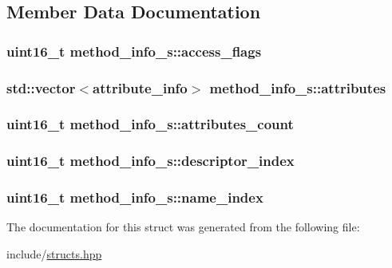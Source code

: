\subsection{Member Data Documentation}
\hypertarget{structmethod__info__s_a062a031a987939214bf617101bce7435}{
\subsubsection[{access\+\_\+flags}]{\setlength{\rightskip}{0pt plus 5cm}uint16\+\_\+t method\+\_\+info\+\_\+s\+::access\+\_\+flags}}\label{structmethod__info__s_a062a031a987939214bf617101bce7435}
\hypertarget{structmethod__info__s_a4e4f4472bdd775cda7fdc50797defe66}{
\subsubsection[{attributes}]{\setlength{\rightskip}{0pt plus 5cm}std\+::vector$<${\bf attribute\+\_\+info}$>$ method\+\_\+info\+\_\+s\+::attributes}}\label{structmethod__info__s_a4e4f4472bdd775cda7fdc50797defe66}
\hypertarget{structmethod__info__s_afbbdab1523d8260e88ca3b0e09ad579d}{
\subsubsection[{attributes\+\_\+count}]{\setlength{\rightskip}{0pt plus 5cm}uint16\+\_\+t method\+\_\+info\+\_\+s\+::attributes\+\_\+count}}\label{structmethod__info__s_afbbdab1523d8260e88ca3b0e09ad579d}
\hypertarget{structmethod__info__s_af93c8318d7968679bf177a79ca5df51b}{
\subsubsection[{descriptor\+\_\+index}]{\setlength{\rightskip}{0pt plus 5cm}uint16\+\_\+t method\+\_\+info\+\_\+s\+::descriptor\+\_\+index}}\label{structmethod__info__s_af93c8318d7968679bf177a79ca5df51b}
\hypertarget{structmethod__info__s_ae7934a7245dbcbb518002309acbb53ae}{
\subsubsection[{name\+\_\+index}]{\setlength{\rightskip}{0pt plus 5cm}uint16\+\_\+t method\+\_\+info\+\_\+s\+::name\+\_\+index}}\label{structmethod__info__s_ae7934a7245dbcbb518002309acbb53ae}


The documentation for this struct was generated from the following file\+:\begin{DoxyCompactItemize}
\item 
include/\hyperlink{structs_8hpp}{structs.\+hpp}\end{DoxyCompactItemize}
